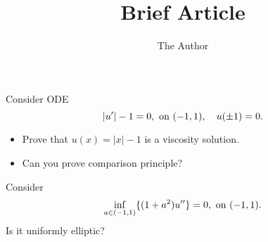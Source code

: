 \documentclass[11pt]{amsart}
\title{Brief Article}
\author{The Author}
\begin{document}

Consider ODE
$$|u'| -1 = 0, \hbox{ on } (-1, 1), \quad u(\pm 1) = 0.$$
\begin{itemize}
\item
Prove that $u(x) = |x|-1$ is a viscosity solution.
\item Can you prove comparison principle?
\end{itemize}

Consider
$$\inf_{a\in (-1, 1)} \{(1+a^2) u''\}  = 0, \hbox{ on } (-1, 1).$$ 
Is it uniformly elliptic?
\end{document}
